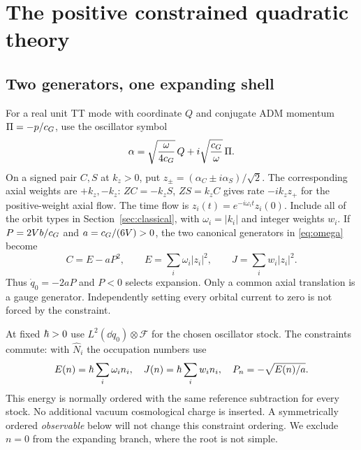 \section{The positive constrained quadratic theory}\label{sec:quantum}

\subsection{Two generators, one expanding shell}

For a real unit TT mode with coordinate \(Q\) and conjugate ADM momentum \(\Pi=-p/c_G\), use the oscillator symbol
\[
 \alpha=\sqrt{\frac{\omega}{4c_G}}\,Q+
                 i\sqrt{\frac{c_G}{\omega}}\,\Pi .
\]
On a signed pair \(C,S\) at \(k_z>0\), put
\(z_\pm=(\alpha_C\pm i\alpha_S)/\sqrt2\).
The corresponding axial weights are \(+k_z,-k_z\): \(ZC=-k_zS\), \(ZS=k_zC\) gives rate \(-ik_z z_+\) for the positive-weight axial flow. The time flow is \(z_i(t)=e^{-i\omega_it}z_i(0)\). Include all of the orbit types in Section~\ref{sec:classical}, with \(\omega_i=|k_i|\) and integer weights \(w_i\). If \(P=2Vb/c_G\) and \(a=c_G/(6V)>0\), the two canonical generators in \eqref{eq:omega} become
\begin{equation}\label{eq:gens}
     C=E-aP^2,\qquad E=\sum_i\omega_i|z_i|^2,\qquad
     J=\sum_iw_i|z_i|^2 .
\end{equation}
Thus \(\dot q_0=-2aP\) and \(P<0\) selects expansion. Only a common axial translation is a gauge generator. Independently setting every orbital current to zero is not forced by the constraint.

At fixed \(\hbar>0\) use \(L^2(\dd q_0)\otimes\mathcal F\) for the chosen oscillator stock. The constraints commute: with \(\hat N_i\) the occupation numbers use
\[
 E(n)=\hbar\sum_i\omega_i n_i,\quad
 J(n)=\hbar\sum_i w_i n_i,\quad
 P_n=-\sqrt{E(n)/a}.
\]
This energy is normally ordered with the same reference subtraction for every stock. No additional vacuum cosmological charge is inserted. A symmetrically ordered \emph{observable} below will not change this constraint ordering. We exclude \(n=0\) from the expanding branch, where the root is not simple.

